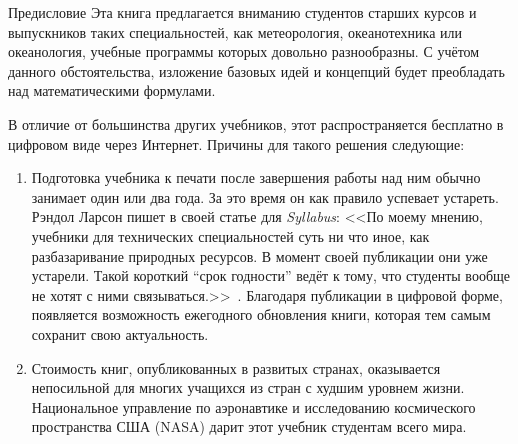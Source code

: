 \begin{chapter}{Предисловие}
Эта книга предлагается вниманию студентов старших курсов и выпускников
таких специальностей, как метеорология, океанотехника или
океанология, учебные программы которых довольно разнообразны.  С
учётом данного обстоятельства, изложение базовых идей и концепций будет
преобладать над математическими формулами.


В отличие от большинства других учебников, этот распространяется
бесплатно в цифровом виде через Интернет. Причины для такого решения
следующие:
\begin{enumerate}

\item
Подготовка учебника к печати после завершения работы над ним обычно
занимает один или два года. За это время он как правило успевает устареть.
Рэндол Ларсон пишет в своей статье для \textit{Syllabus}: <<По моему мнению,
учебники для технических специальностей суть ни что иное, как разбазаривание
природных ресурсов. В момент своей публикации они уже устарели.
Такой короткий ``срок годности'' ведёт к тому, что студенты вообще не хотят
с ними связываться.>>~\cite{Larson:2002}.
Благодаря публикации в цифровой форме, появляется возможность ежегодного
обновления книги, которая тем самым сохранит свою актуальность.

\item
Стоимость книг, опубликованных в развитых странах, оказывается
непосильной для многих учащихся из стран с худшим уровнем жизни.
Национальное управление по аэронавтике и исследованию космического
пространства США (NASA) дарит этот учебник студентам всего
мира.
\end{enumerate}


\end{chapter}
